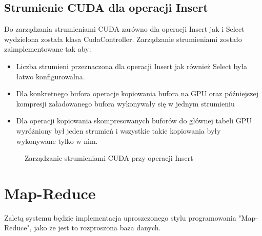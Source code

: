 \documentclass[paper=a4, fontsize=11pt]{scrartcl} %
\numberwithin{equation}{section} %
\numberwithin{figure}{section} %
\numberwithin{table}{section} %
\begin{document}
		\clearpage

	\subsection{Strumienie CUDA dla operacji Insert}
		Do zarządzania strumieniami CUDA zarówno dla operacji Insert jak i Select wydzielona została klasa CudaController. Zarządzanie strumieniami zostało zaimplementowane tak aby:
		\begin{itemize}
			\item Liczba strumieni przeznaczona dla operacji Insert jak również Select była łatwo konfigurowalna. 
			\item Dla konkretnego bufora operacje kopiowania bufora na GPU oraz późniejszej kompresji załadowanego bufora wykonywały się w jednym strumieniu
			\item Dla operacji kopiowania skompresowanych buforów do głównej tabeli GPU wyróżniony był jeden strumień i wszystkie takie kopiowania były wykonywane tylko w nim.
		\end{itemize}
		\begin{figure}[t]
			\begin{center}
				\caption{Zarządzanie strumieniami CUDA przy operacji Insert}
			\end{center}
		\end{figure}
		\clearpage

\section{Map-Reduce}
Zaletą systemu będzie implementacja uproszczonego stylu programowania "Map-Reduce", jako że jest to rozproszona baza danych.
\end{document}
